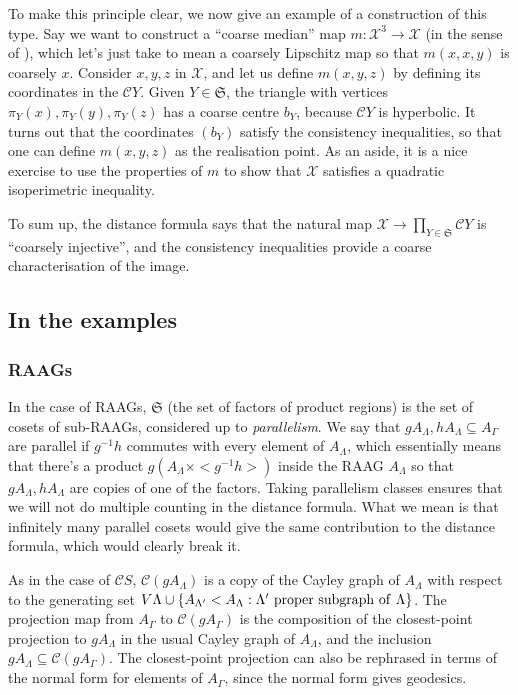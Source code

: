 \documentclass[11pt,oneside]{amsart}
\theoremstyle{definition}
\newcommand{\cuco}[1]{{\mathcal #1}}
\newcommand{\fontact}{{\mathcal C}}
\begin{document}
To make this principle clear, we now give an example of a construction of this type. Say we want to construct a ``coarse median'' map $m:\cuco X^3\to\cuco X$ (in the sense of \cite{Bow_coarse_median}), which let's just take to mean a coarsely Lipschitz map so that $m(x,x,y)$ is coarsely $x$. Consider $x,y,z$ in $\cuco X$, and let us define $m(x,y,z)$ by defining its coordinates in the $\fontact Y$. Given $Y\in\mathfrak S$, the triangle with vertices $\pi_Y(x),\pi_Y(y),\pi_Y(z)$ has a coarse centre $b_Y$, because $\fontact Y$ is hyperbolic. It turns out that the coordinates $(b_Y)$ satisfy the consistency inequalities, so that one can define $m(x,y,z)$ as the realisation point. As an aside, it is a nice exercise to use the properties of $m$ to show that $\cuco X$ satisfies a quadratic isoperimetric inequality.

To sum up, the distance formula says that the natural map $\cuco X\to\prod_{Y\in\mathfrak S}\fontact Y$ is ``coarsely injective'', and the consistency inequalities provide a coarse characterisation of the image.

\subsection{In the examples}

\subsubsection{RAAGs} 

In the case of RAAGs, $\mathfrak S$ (the set of factors of product regions) is the set of cosets of sub-RAAGs, considered up to \emph{parallelism}. We say that $gA_\Lambda, hA_\Lambda \subseteq A_{\Gamma}$ are parallel if $g^{-1}h$ commutes with every element of $A_\Lambda$, which essentially means that there's a product $g(A_\Lambda\times <g^{-1}h>)$ inside the RAAG $A_\Lambda$ so that $gA_\Lambda, hA_\Lambda$ are copies of one of the factors. Taking parallelism classes ensures that we will not do multiple counting in the distance formula. What we mean is that infinitely many parallel cosets would give the same contribution to the distance formula, which would clearly break it.

As in the case of $\fontact S$, $\fontact (gA_\Lambda)$ is a copy of the Cayley graph of $A_\Lambda$ with respect to the generating set $V\Lambda\cup \{A_{\Lambda'}<A_\Lambda:\Lambda'{\rm\ proper\ subgraph\ of\ }\Lambda\}$. The projection map from $A_\Gamma$ to $\fontact (gA_{\Gamma})$ is the composition of the closest-point projection to $gA_\Lambda$ in the usual Cayley graph of $A_\Lambda$, and the inclusion $gA_\Lambda\subseteq \fontact (gA_{\Gamma})$. The closest-point projection can also be rephrased in terms of the normal form for elements of $A_\Gamma$, since the normal form gives geodesics.
\end{document}
